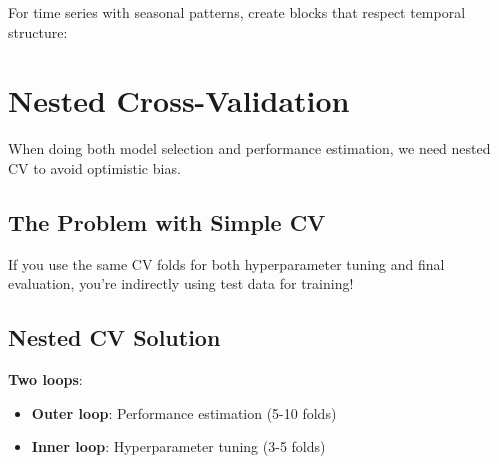 \documentclass{article}
\begin{document}
For time series with seasonal patterns, create blocks that respect temporal structure:

\begin{center}
\end{center}

\section{Nested Cross-Validation}

When doing both model selection and performance estimation, we need nested CV to avoid optimistic bias.

\subsection{The Problem with Simple CV}

If you use the same CV folds for both hyperparameter tuning and final evaluation, you're indirectly using test data for training!

\subsection{Nested CV Solution}

\textbf{Two loops}:
\begin{itemize}
    \item \textbf{Outer loop}: Performance estimation (5-10 folds)
    \item \textbf{Inner loop}: Hyperparameter tuning (3-5 folds)
\end{itemize}
\end{document}
